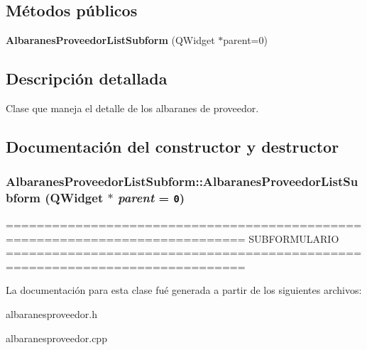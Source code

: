 \subsection*{M\'{e}todos p\'{u}blicos}
\begin{CompactItemize}
\item 
{\bf Albaranes\-Proveedor\-List\-Subform} (QWidget $\ast$parent=0)
\end{CompactItemize}


\subsection{Descripci\'{o}n detallada}
Clase que maneja el detalle de los albaranes de proveedor. 



\subsection{Documentaci\'{o}n del constructor y destructor}
\subsubsection{\setlength{\rightskip}{0pt plus 5cm}Albaranes\-Proveedor\-List\-Subform::Albaranes\-Proveedor\-List\-Subform (QWidget $\ast$ {\em parent} = {\tt 0})}\label{classAlbaranesProveedorListSubform_a0}


============================================================================= SUBFORMULARIO ============================================================================= 

La documentaci\'{o}n para esta clase fu\'{e} generada a partir de los siguientes archivos:\begin{CompactItemize}
\item 
albaranesproveedor.h\item 
albaranesproveedor.cpp\end{CompactItemize}
